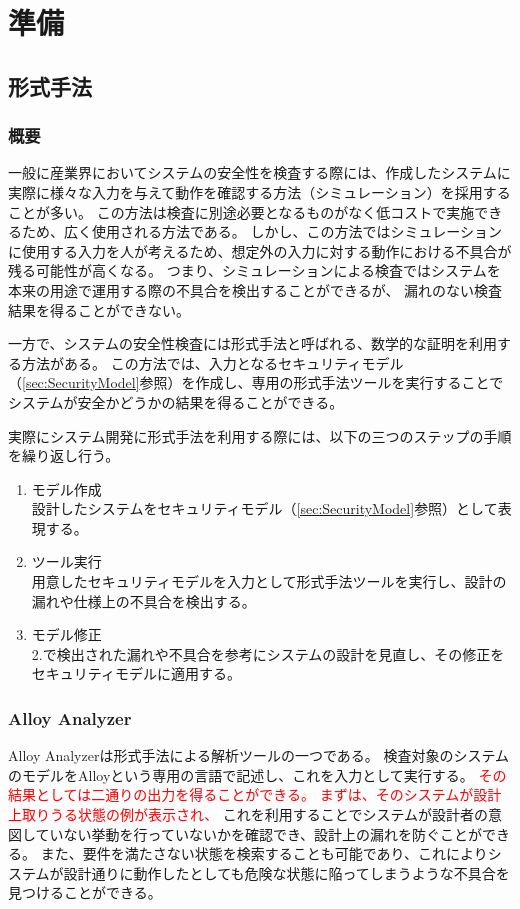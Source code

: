 \documentclass[12pt,a4paper]{jbook}
\begin{document}
\chapter{準備}
\section{形式手法}
\subsection{概要}
一般に産業界においてシステムの安全性を検査する際には、作成したシステムに実際に様々な入力を与えて動作を確認する方法（シミュレーション）を採用することが多い。
この方法は検査に別途必要となるものがなく低コストで実施できるため、広く使用される方法である。
しかし、この方法ではシミュレーションに使用する入力を人が考えるため、想定外の入力に対する動作における不具合が残る可能性が高くなる。
つまり、シミュレーションによる検査ではシステムを本来の用途で運用する際の不具合を検出することができるが、
\color{red}
漏れのない検査結果を得ることができない。
\color{black}

一方で、システムの安全性検査には形式手法と呼ばれる、数学的な証明を利用する方法がある。
この方法では、入力となるセキュリティモデル（\ref{sec:SecurityModel}参照）を作成し、専用の形式手法ツールを実行することでシステムが安全かどうかの結果を得ることができる。

\color{red}
実際にシステム開発に形式手法を利用する際には、以下の三つのステップの手順を繰り返し行う。
\color{black}
\begin{enumerate}
\item モデル作成\\
設計したシステムをセキュリティモデル（\ref{sec:SecurityModel}参照）として表現する。
\item ツール実行\\
用意したセキュリティモデルを入力として形式手法ツールを実行し、設計の漏れや仕様上の不具合を検出する。
\item モデル修正\\
2.で検出された漏れや不具合を参考にシステムの設計を見直し、その修正をセキュリティモデルに適用する。
\end{enumerate}

\subsection{Alloy Analyzer}
Alloy Analyzerは形式手法による解析ツールの一つである。
検査対象のシステムのモデルをAlloyという専用の言語で記述し、これを入力として実行する。
\textcolor{red}{
その結果としては二通りの出力を得ることができる。
まずは、そのシステムが設計上取りうる状態の例が表示され、
}
これを利用することでシステムが設計者の意図していない挙動を行っていないかを確認でき、設計上の漏れを防ぐことができる。
また、要件を満たさない状態を検索することも可能であり、これによりシステムが設計通りに動作したとしても危険な状態に陥ってしまうような不具合を見つけることができる。
\end{document}
